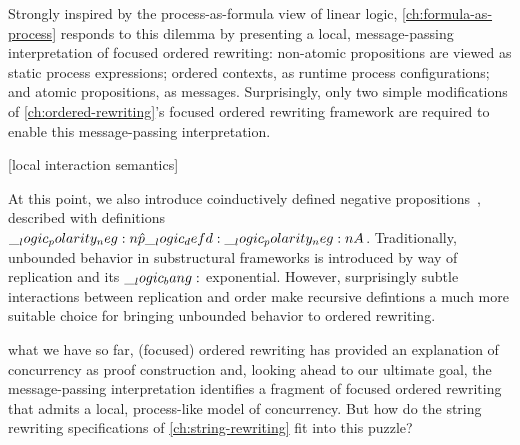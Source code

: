 Strongly inspired by the process-as-formula view of linear logic\autocites{Miller:ELP92}{Cervesato+Scedrov:IC09}, \cref{ch:formula-as-process} responds to this dilemma by presenting a local, message-passing interpretation of focused ordered rewriting:
non-atomic propositions are viewed as static process expressions; ordered contexts, as runtime process configurations; and atomic propositions, as messages.
Surprisingly, only two simple modifications of \cref{ch:ordered-rewriting}'s focused ordered rewriting framework are required to enable this message-passing interpretation.


[local interaction semantics]

At this point, we also introduce coinductively defined negative propositions~, described with definitions $\__logic_polarity_neg:n {\hat{p}} \__logic_defd: \__logic_polarity_neg:n {A}$.
Traditionally, unbounded behavior in substructural frameworks is introduced by way of replication and its $\__logic_bang:$ exponential.
However, surprisingly subtle interactions between replication and order make recursive defintions a much more suitable choice for bringing unbounded behavior to ordered rewriting.




 what we have so far, (focused) ordered rewriting has provided an explanation of concurrency as proof construction and, looking ahead to our ultimate goal, the message-passing interpretation identifies a fragment of focused ordered rewriting that admits a local, process-like model of concurrency.
But how do the string rewriting specifications of \cref{ch:string-rewriting} fit into this puzzle?

